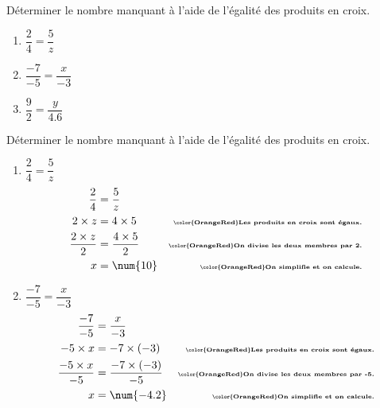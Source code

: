 \begin{exercice*}
    Déterminer le nombre manquant à l'aide de l'égalité des produits en croix.    
    \begin{enumerate}
        \item $\dfrac{2}{4}=\dfrac{5}{z}$\smallskip
        \item $\dfrac{-7}{-5}=\dfrac{x}{-3}$\smallskip
        \item $\dfrac{9}{2}=\dfrac{y}{\num{4.6}}$        
    \end{enumerate}
\end{exercice*}
\begin{corrige}
    Déterminer le nombre manquant à l'aide de l'égalité des produits en croix.\par
    \begin{enumerate}
        \item $\dfrac{2}{4}=\dfrac{5}{z}$
        \begin{align*}
            \dfrac{2}{4}        &=\dfrac{5}{z}           &\\
            2\times z           &= 4\times 5             &\text{\bfseries\tiny\color{OrangeRed}Les produits en croix sont égaux.}\\
            \dfrac{2\times z}{2}&= \dfrac{4\times 5}{2}  &\text{\bfseries\tiny\color{OrangeRed}On divise les deux membres par 2.}\\
            x                   &=\num{10}              &\text{\bfseries\tiny\color{OrangeRed}On simplifie et on calcule.}
        \end{align*}
        \item $\dfrac{-7}{-5}=\dfrac{x}{-3}$
        \begin{align*}
            \dfrac{-7}{-5}        &=\dfrac{x}{-3}           &\\
            -5\times x           &= -7\times (-3)           &\text{\bfseries\tiny\color{OrangeRed}Les produits en croix sont égaux.}\\
            \dfrac{-5\times x}{-5}&= \dfrac{-7\times (-3)}{-5}  &\text{\bfseries\tiny\color{OrangeRed}On divise les deux membres par -5.}\\
            x                   &=\num{-4.2}              &\text{\bfseries\tiny\color{OrangeRed}On simplifie et on calcule.}
        \end{align*}

\end{enumerate}
\end{corrige}
